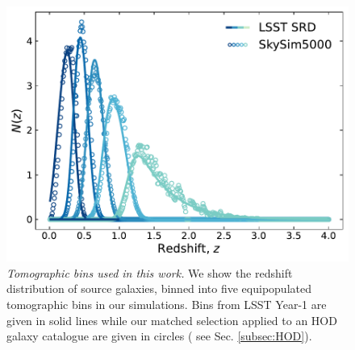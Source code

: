\begin{figure}
\includegraphics[width=\columnwidth]{graphs/redshift_distribution.pdf}
\caption{\textit{Tomographic bins used in this work.} 
We show the redshift distribution of source galaxies, binned into five equipopulated tomographic bins in our simulations.
Bins from LSST Year-1 are given in solid lines while our matched selection applied to an HOD galaxy catalogue are given in circles ( see Sec. \ref{subsec:HOD}).}
\label{fig:Nz}
\end{figure}